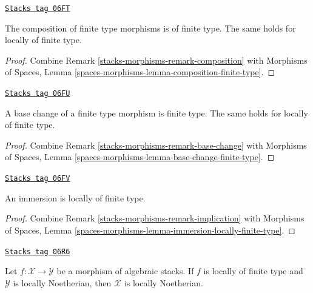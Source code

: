 \begin{lemma}
\label{stacks-morphisms-lemma-composition-finite-type}
\href{https://stacks.math.columbia.edu/tag/06FT}{\texttt{Stacks tag 06FT}}

The composition of finite type morphisms is of finite type.
The same holds for locally of finite type.
\end{lemma}

\begin{proof}
Combine
Remark \ref{stacks-morphisms-remark-composition}
with
Morphisms of Spaces, Lemma \ref{spaces-morphisms-lemma-composition-finite-type}.
\end{proof}

\begin{lemma}
\label{stacks-morphisms-lemma-base-change-finite-type}
\href{https://stacks.math.columbia.edu/tag/06FU}{\texttt{Stacks tag 06FU}}

A base change of a finite type morphism is finite type.
The same holds for locally of finite type.
\end{lemma}

\begin{proof}
Combine
Remark \ref{stacks-morphisms-remark-base-change}
with
Morphisms of Spaces, Lemma \ref{spaces-morphisms-lemma-base-change-finite-type}.
\end{proof}

\begin{lemma}
\label{stacks-morphisms-lemma-immersion-locally-finite-type}
\href{https://stacks.math.columbia.edu/tag/06FV}{\texttt{Stacks tag 06FV}}

An immersion is locally of finite type.
\end{lemma}

\begin{proof}
Combine Remark \ref{stacks-morphisms-remark-implication} with
Morphisms of Spaces,
Lemma \ref{spaces-morphisms-lemma-immersion-locally-finite-type}.
\end{proof}

\begin{lemma}
\label{stacks-morphisms-lemma-locally-finite-type-locally-noetherian}
\href{https://stacks.math.columbia.edu/tag/06R6}{\texttt{Stacks tag 06R6}}

Let $f : \mathcal{X} \to \mathcal{Y}$ be a morphism of algebraic stacks.
If $f$ is locally of finite type and $\mathcal{Y}$ is locally Noetherian,
then $\mathcal{X}$ is locally Noetherian.
\end{lemma}

